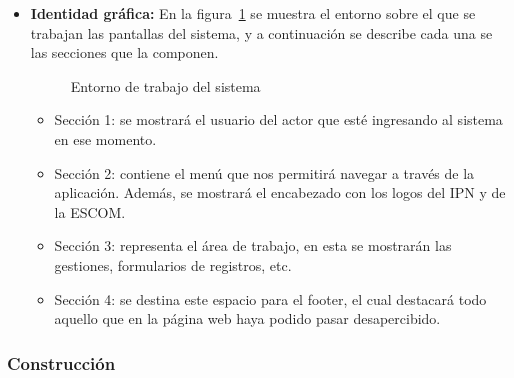 \begin{itemize}
		\item \textbf{Identidad gráfica:} En la figura~\ref{fig:entornoTrabajo} se muestra el entorno sobre el que se trabajan las pantallas del sistema, y a continuación se describe cada una se las secciones que la componen.
		
		\begin{figure}[htbp!]
			\begin{center}
				\caption{Entorno de trabajo del sistema}
				\label{fig:entornoTrabajo}
			\end{center}
		\end{figure}	
		
		\begin{itemize}
			\item Sección 1: se mostrará el usuario del actor que esté ingresando al sistema en ese momento.
			
			\item Sección 2: contiene el menú que nos permitirá navegar a través de la aplicación. Además, se mostrará el encabezado con los logos del IPN y de la ESCOM. 
			
			\item Sección 3: representa el área de trabajo, en esta se mostrarán las gestiones, formularios de registros, etc.
			
			\item Sección 4: se destina este espacio para el footer, el cual destacará todo aquello que en la página web haya podido pasar desapercibido.
		\end{itemize}
		
		
	\end{itemize}
	
	\subsubsection{Construcción}
	
